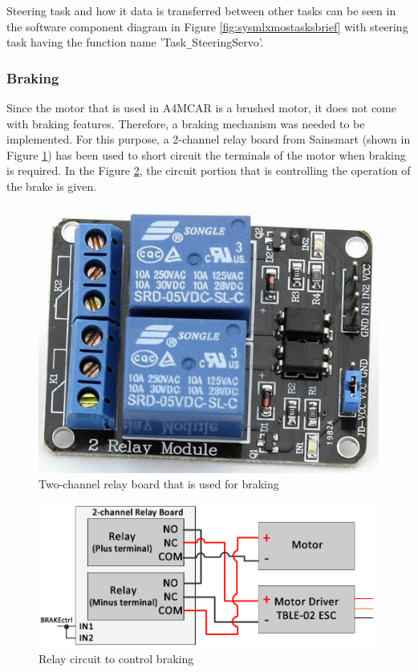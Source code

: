 Steering task and how it data is transferred between other tasks can be seen in the software component diagram in Figure \ref{fig:sysmlxmostasksbrief} with steering task having the function name 'Task\texttt{\_}SteeringServo'.

\subsubsection{Braking}
Since the motor that is used in A4MCAR is a brushed motor, it does not come with braking features. Therefore, a braking mechanism was needed to be implemented. For this purpose, a 2-channel relay board from Sainsmart (shown in Figure \ref{fig:relayboard}) has been used to short circuit the terminals of the motor when braking is required. In the Figure \ref{fig:brake}, the circuit portion that is controlling the operation of the brake is given.
\begin{figure}[!ht]
	\centering
	\captionsetup{justification=centering}
	\includegraphics[scale=0.4]{content/images/relayboard.jpg}
	\caption{Two-channel relay board that is used for braking}
	\label{fig:relayboard}
\end{figure}

\begin{figure}[!ht]
	\centering
	\captionsetup{justification=centering}
	\includegraphics[scale=0.5]{content/images/brake.png}
	\caption{Relay circuit to control braking}
	\label{fig:brake}
\end{figure}

